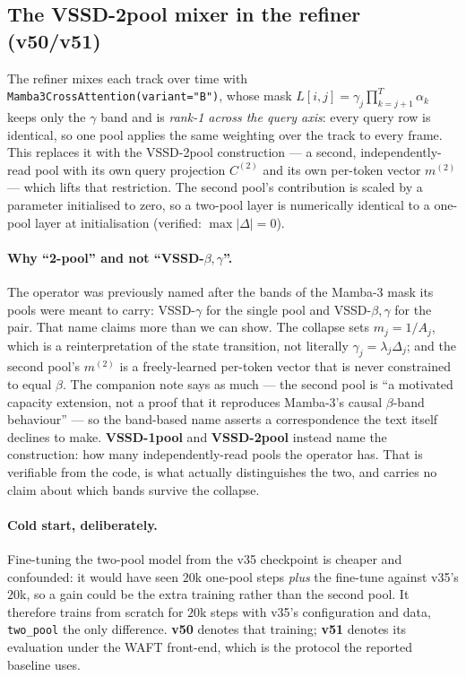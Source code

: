 \documentclass[11pt,a4paper]{article}
\begin{document}
\subsection{The VSSD-2pool mixer in the refiner (v50/v51)}
\label{sec:v50-twopool}

The refiner mixes each track over time with \texttt{Mamba3CrossAttention(variant="B")}, whose
mask $L[i,j]=\gamma_j\prod_{k=j+1}^{T}\alpha_k$ keeps only the $\gamma$ band and is \emph{rank-1
across the query axis}: every query row is identical, so one pool applies the same weighting over
the track to every frame. This replaces it with the VSSD-2pool construction --- a
second, independently-read pool with its own query projection $C^{(2)}$ and its own per-token
vector $m^{(2)}$ --- which lifts that restriction. The second pool's contribution is scaled by a
parameter initialised to zero, so a two-pool layer is numerically identical to a one-pool layer at
initialisation (verified: $\max|\Delta|=0$).

\paragraph{Why ``2-pool'' and not ``VSSD-$\beta,\gamma$''.} The operator was previously named
after the bands of the Mamba-3 mask its pools were meant to carry: VSSD-$\gamma$ for the single
pool and VSSD-$\beta,\gamma$ for the pair. That name claims more than we can show. The collapse
sets $m_j = 1/A_j$, which is a reinterpretation of the state transition, not literally
$\gamma_j = \lambda_j\Delta_j$; and the second pool's $m^{(2)}$ is a freely-learned per-token
vector that is never constrained to equal $\beta$. The companion note says as much --- the second
pool is ``a motivated capacity extension, not a proof that it reproduces Mamba-3's causal
$\beta$-band behaviour'' --- so the band-based name asserts a correspondence the text itself
declines to make. \textbf{VSSD-1pool} and \textbf{VSSD-2pool} instead name the construction: how
many independently-read pools the operator has. That is verifiable from the code, is what
actually distinguishes the two, and carries no claim about which bands survive the collapse.

\paragraph{Cold start, deliberately.} Fine-tuning the two-pool model from the v35 checkpoint is
cheaper and confounded: it would have seen $20$k one-pool steps \emph{plus} the fine-tune against
v35's $20$k, so a gain could be the extra training rather than the second pool. It therefore trains
from scratch for $20$k steps with v35's configuration and data, \texttt{two\_pool} the only
difference. \textbf{v50} denotes that training; \textbf{v51} denotes its evaluation under the
WAFT front-end, which is the protocol the reported baseline uses.
\end{document}
